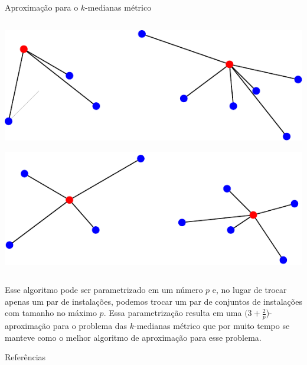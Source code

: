 \documentclass[final]{beamer}
\begin{document}
\begin{frame}[t]
\begin{columns}[t]
\begin{column}{0.47\paperwidth}
\begin{block}{Aproximação para o $k$-medianas métrico}
\begin{columns}
         \begin{column}{0.23\paperwidth}
          \begin{tcolorbox}
            \includegraphics[scale=1.2]{imgs/local-search3.pdf}
          \end{tcolorbox}

          \begin{tcolorbox}
            \includegraphics[scale=1.2]{imgs/local-search5.pdf}
          \end{tcolorbox}
        \end{column}
      \end{columns}
      \vspace{0.5cm}
      Esse algoritmo pode ser parametrizado em um número $p$ e, no lugar de trocar apenas um par de instalações, podemos trocar um par de conjuntos de instalações com tamanho no máximo $p$. Essa parametrização resulta em uma $(3 + \frac{2}{p}$)-aproximação para o problema das $k$-medianas métrico que por muito tempo se manteve como o melhor algoritmo de aproximação para esse problema.

\end{block}
\begin{block}{Referências}
      

\end{block}
\end{column}
\end{columns}
\end{frame}
\end{document}
